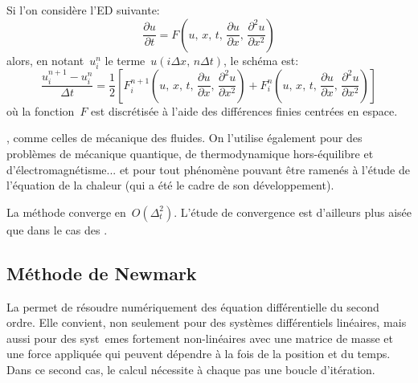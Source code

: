 \medskip
Si l'on considère l'ED suivante:
\begin{equation}
  \frac{\partial u}{\partial t} = F\left(u,\, x,\, t,\, \frac{\partial u}{\partial x},\, \frac{\partial^2 u}{\partial x^2}\right)
\end{equation}
alors, en notant~$u_{i}^{n}$ le terme~$u(i \Delta x,\, n \Delta t)$, le schéma est:
\begin{equation}
  \frac{u_{i}^{n + 1} - u_{i}^{n}}{\Delta t} = \frac{1}{2}\left[ F_{i}^{n + 1}\left(u,\, x,\, t,\, \frac{\partial u}{\partial x},\, \frac{\partial^2 u}{\partial x^2}\right) + F_{i}^{n}\left(u,\, x,\, t,\, \frac{\partial u}{\partial x},\, \frac{\partial^2 u}{\partial x^2}\right) \right]
\end{equation}
où la fonction~$F$ est discrétisée à l'aide des différences finies centrées en espace.

\medskip
{}, comme celles de mécanique des fluides.
On l'utilise également pour des problèmes de mécanique quantique, de thermodynamique hors-équilibre
et d'électromagnétisme... et pour tout phénomène pouvant être ramenés à l'étude de l'équation de la chaleur
(qui a été le cadre de son développement).

\medskip
La méthode converge en~$O(\Delta_t^2)$.
L'étude de convergence est d'ailleurs plus aisée que dans le cas des .
\subsection{Méthode de Newmark}\label{Sec-Newmark} La  permet de résoudre numériquement des équation différentielle du second ordre. Elle convient, non seulement pour des systèmes différentiels linéaires, mais aussi pour des syst\ emes fortement non-linéaires avec une matrice de masse et une force appliquée qui peuvent dépendre à la fois de la position et du temps. Dans ce second cas, le calcul nécessite à chaque pas une boucle d'itération. 

